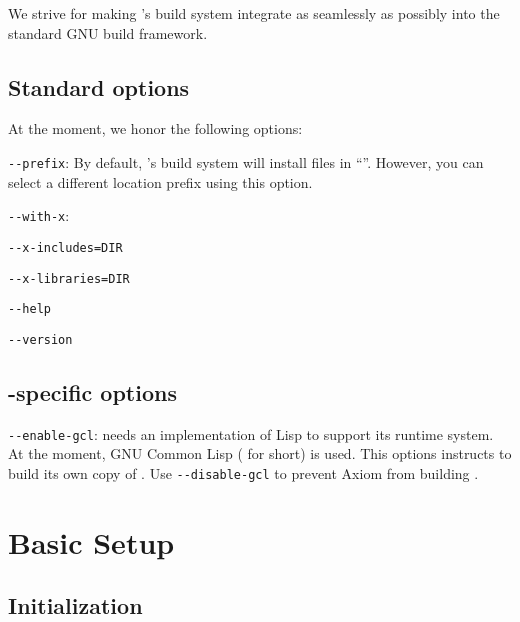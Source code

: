 \documentclass[12pt]{article}
\begin{document}
We strive for making 's build system integrate as seamlessly as
possibly into the standard GNU build framework.

\subsection{Standard options}
\label{sec:config-options:std}

At the moment, we honor the following options:
\begin{description}
\item \verb!--prefix!:
  By default, 's build system will install files
  in ``''.  However, you
  can select a different location prefix using this option.

\item \verb!--with-x!:

\item \verb!--x-includes=DIR!

\item \verb!--x-libraries=DIR!

\item \verb!--help!

\item \verb!--version!
\end{description}


\subsection{-specific options}
\label{sec:config-options:axiom-specific}

\begin{description}
\item \verb!--enable-gcl!:
   needs an implementation of Lisp to support its
  runtime system.  At the moment, GNU Common Lisp ( for short)
  is used.  This options instructs  to build its own copy
  of .  Use \verb!--disable-gcl! to prevent Axiom
  from building .
\end{description}

\section{Basic Setup}
\label{sec:basic-setup}

\subsection{ Initialization}
\label{sec:basic-setup:init}
\end{document}
